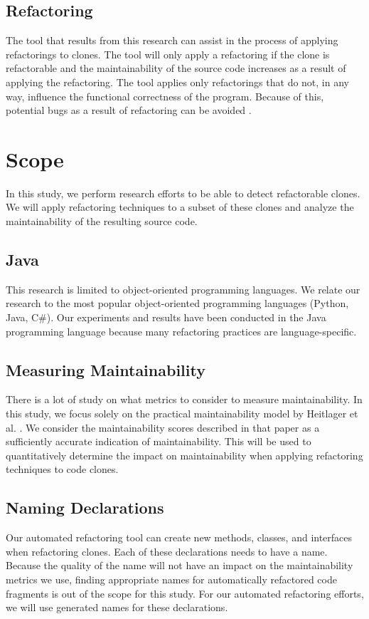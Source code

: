 \subsection{Refactoring}
The tool that results from this research can assist in the process of applying refactorings to clones. The tool will only apply a refactoring if the clone is refactorable and the maintainability of the source code increases as a result of applying the refactoring. The tool applies only refactorings that do not, in any way, influence the functional correctness of the program. Because of this, potential bugs as a result of refactoring can be avoided \cite{bavota2012does}.

\section{Scope}
In this study, we perform research efforts to be able to detect refactorable clones. We will apply refactoring techniques to a subset of these clones and analyze the maintainability of the resulting source code.

\subsection{Java}
This research is limited to object-oriented programming languages. We relate our research to the most popular object-oriented programming languages (Python, Java, C\#). Our experiments and results have been conducted in the Java programming language because many refactoring practices are language-specific.

\subsection{Measuring Maintainability}
There is a lot of study on what metrics to consider to measure maintainability. In this study, we focus solely on the practical maintainability model by Heitlager et al. \cite{heitlager2007practical}. We consider the maintainability scores described in that paper as a sufficiently accurate indication of maintainability. This will be used to quantitatively determine the impact on maintainability when applying refactoring techniques to code clones.

\subsection{Naming Declarations}
Our automated refactoring tool can create new methods, classes, and interfaces when refactoring clones. Each of these declarations needs to have a name. Because the quality of the name will not have an impact on the maintainability metrics we use, finding appropriate names for automatically refactored code fragments is out of the scope for this study. For our automated refactoring efforts, we will use generated names for these declarations. %

